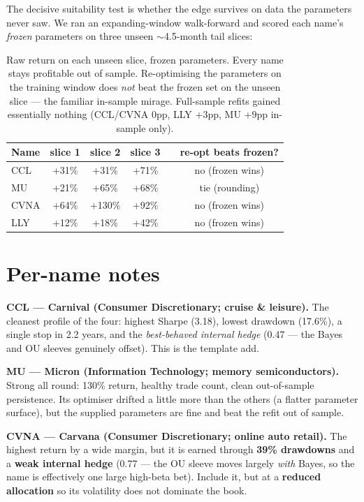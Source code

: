 \documentclass[11pt]{article}
\begin{document}
The decisive suitability test is whether the edge survives on data the parameters never saw. We
ran an expanding-window walk-forward and scored each name's \emph{frozen} parameters on three
unseen $\sim$4.5-month tail slices:

\begin{table}[H]\centering\small
\renewcommand{\arraystretch}{1.15}
\begin{tabular}{l ccc c c}
\toprule
\textbf{Name} & \textbf{slice 1} & \textbf{slice 2} & \textbf{slice 3} & & \textbf{re-opt beats frozen?}\\
\midrule
CCL  & +31\% & +31\% & +71\%  & & no (frozen wins)\\
MU   & +21\% & +65\% & +68\%  & & tie (rounding)\\
CVNA & +64\% & +130\% & +92\% & & no (frozen wins)\\
LLY  & +12\% & +18\% & +42\%  & & no (frozen wins)\\
\bottomrule
\end{tabular}
\caption*{\footnotesize Raw return on each unseen slice, frozen parameters. Every name stays
profitable out of sample. Re-optimising the parameters on the training window does \emph{not}
beat the frozen set on the unseen slice --- the familiar in-sample mirage. Full-sample refits
gained essentially nothing (CCL/CVNA $0$pp, LLY $+3$pp, MU $+9$pp in-sample only).}
\end{table}

\section{Per-name notes}

\textbf{CCL --- Carnival (Consumer Discretionary; cruise \& leisure).} The cleanest profile of
the four: highest Sharpe (3.18), lowest drawdown (17.6\%), a single stop in 2.2 years, and the
\emph{best-behaved internal hedge} (0.47 --- the Bayes and OU sleeves genuinely offset). This is
the template add.

\textbf{MU --- Micron (Information Technology; memory semiconductors).} Strong all round: 130\%
return, healthy trade count, clean out-of-sample persistence. Its optimiser drifted a little more
than the others (a flatter parameter surface), but the supplied parameters are fine and beat the
refit out of sample.

\textbf{CVNA --- Carvana (Consumer Discretionary; online auto retail).} The highest return by a
wide margin, but it is earned through \textbf{39\% drawdowns} and a \textbf{weak internal hedge}
(0.77 --- the OU sleeve moves largely \emph{with} Bayes, so the name is effectively one large
high-beta bet). Include it, but at a \textbf{reduced allocation} so its volatility does not
dominate the book.
\end{document}
